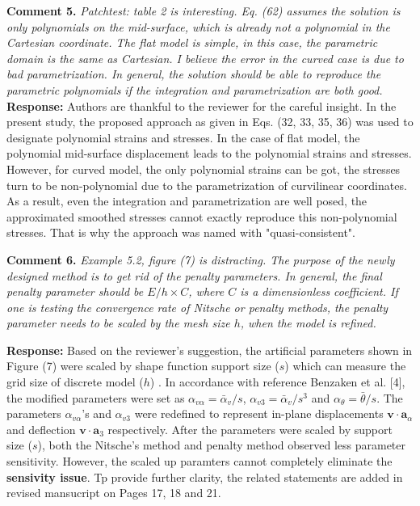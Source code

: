 \documentclass{article}
\begin{document}
\textbf{Comment 5.} \textit{Patchtest: table 2 is interesting. Eq. (62) assumes the solution is only polynomials on the mid-surface, which is already not a polynomial in the Cartesian coordinate. The flat model is simple, in this case, the parametric domain is the same as Cartesian. I believe the error in the curved case is due to bad parametrization. In general, the solution should be able to reproduce the parametric polynomials if the integration and parametrization are both good.}
\textbf{Response:} Authors are thankful to the reviewer for the careful insight. In the present study, the proposed approach as given in Eqs. (32, 33, 35, 36) was used to designate polynomial strains and stresses. In the case of flat model, the polynomial mid-surface displacement leads to the polynomial strains and stresses. However, for curved model, the only polynomial strains can be got, the stresses turn to be non-polynomial due to the parametrization of curvilinear coordinates. As a result, even the integration and parametrization are well posed, the approximated smoothed stresses cannot exactly reproduce this non-polynomial stresses. That is why the approach was named with "quasi-consistent".
 
\textbf{Comment 6.} \textit{Example 5.2, figure (7) is distracting. The purpose of the newly designed method is to get rid of the penalty parameters. In general, the final penalty parameter should be $E/h\times C$, where $C$ is a dimensionless coefficient. If one is testing the convergence rate of Nitsche or penalty methods, the penalty parameter needs to be scaled by the mesh size $h$, when the model is refined.}

\textbf{Response:} Based on the reviewer's suggestion, the artificial parameters shown in Figure (7) were scaled by shape function support size ($s$) which can measure the grid size of discrete model ($h$) . In accordance with reference Benzaken et al. [4], the modified parameters were set as $\alpha_{v\alpha} = \bar\alpha_v / s$, $\alpha_{v3} = \bar\alpha_v / s^3$ and $\alpha_\theta = \bar \theta / s$. The parameters $\alpha_{v\alpha}$'s and $\alpha_{v3}$ were redefined to represent in-plane displacements $\boldsymbol v \cdot \boldsymbol a_\alpha$ and deflection $\boldsymbol v \cdot \boldsymbol a_3$ respectively. After the parameters were scaled by support size ($s$), both the Nitsche's method and penalty method observed less parameter sensitivity. However, the scaled up paramters cannot completely eliminate the \textbf{sensivity issue}. Tp provide further clarity, the related statements are added in revised mansucript on Pages 17, 18 and 21.
\end{document}

